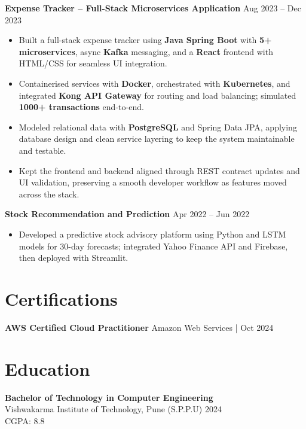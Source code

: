 \documentclass[10pt,letterpaper]{article}
\begin{document}
\textbf{Expense Tracker -- Full-Stack Microservices Application} \hfill Aug 2023 -- Dec 2023
\begin{itemize}[leftmargin=*]
    \item Built a full-stack expense tracker using \textbf{Java Spring Boot} with \textbf{5+ microservices}, async \textbf{Kafka} messaging, and a \textbf{React} frontend with HTML/CSS for seamless UI integration.
    \item Containerised services with \textbf{Docker}, orchestrated with \textbf{Kubernetes}, and integrated \textbf{Kong API Gateway} for routing and load balancing; simulated \textbf{1000+ transactions} end-to-end.
    \item Modeled relational data with \textbf{PostgreSQL} and Spring Data JPA, applying database design and clean service layering to keep the system maintainable and testable.
    \item Kept the frontend and backend aligned through REST contract updates and UI validation, preserving a smooth developer workflow as features moved across the stack.
\end{itemize}

\textbf{Stock Recommendation and Prediction} \hfill Apr 2022 -- Jun 2022
\begin{itemize}[leftmargin=*]
    \item Developed a predictive stock advisory platform using Python and LSTM models for 30-day forecasts; integrated Yahoo Finance API and Firebase, then deployed with Streamlit.
\end{itemize}

\section*{Certifications}
\textbf{AWS Certified Cloud Practitioner} \hfill Amazon Web Services \;|\; Oct 2024 \\

\section*{Education}
\textbf{Bachelor of Technology in Computer Engineering} \\
Vishwakarma Institute of Technology, Pune (S.P.P.U) \hfill 2024 \\
CGPA: 8.8
\end{document}
